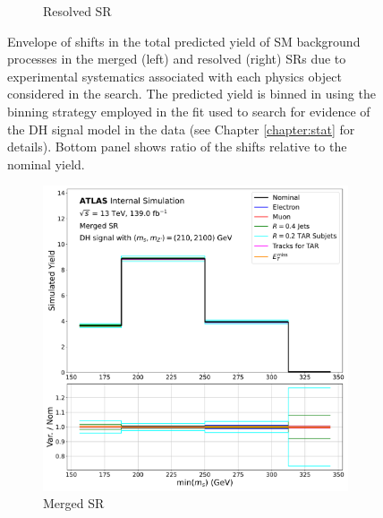 \begin{figure}[htbp]
\begin{subfigure}[t]{0.48\textwidth}
     \caption{Resolved SR}
    \end{subfigure}
    \caption[Envelope of shifts in the total predicted yield of Standard Model background processes in the signal regions due to experimental systematics.]{Envelope of shifts in the total predicted yield of SM background processes in the merged (left) and resolved (right) SRs due to experimental systematics associated with each physics object considered in the search. The predicted yield is binned in \minms using the binning strategy employed in the fit used to search for evidence of the DH signal model in the data (see Chapter \ref{chapter:stat} for details). Bottom panel shows ratio of the shifts relative to the nominal yield.}
   \label{fig:exp_syst_shifts_bkg}
\end{figure}

\begin{figure}[htbp]
  \centering
    \begin{subfigure}[t]{0.48\textwidth}
    \centering
     \includegraphics[width = 0.99\textwidth]{Figures/6/exp_systs_monoSWWsemilep_zp2100_dm200_dh210_SR_mgd_TARJets10_minmS_mgd.pdf}
    \caption{Merged SR}
    \end{subfigure}
    \begin{subfigure}[t]{0.48\textwidth}
    \centering

\end{subfigure}
\end{figure}
